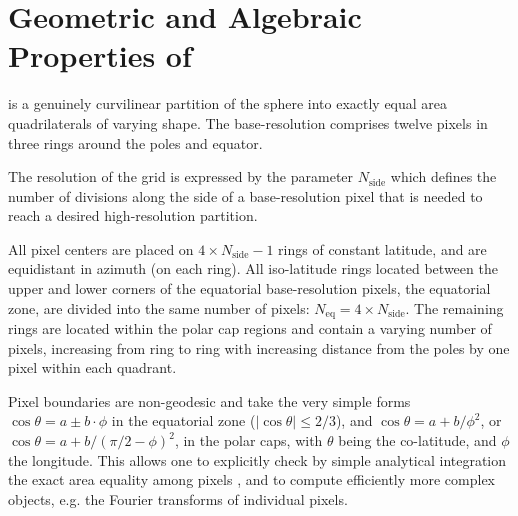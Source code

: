 \documentclass[12pt,twoside]{article}
\newcommand{\nside}{N_{\mathrm{side}}}
\begin{document}
\section{Geometric and Algebraic Properties of \healpix}

\healpix is a genuinely curvilinear partition of the sphere into exactly equal area
quadrilaterals of varying shape. The base-resolution comprises twelve pixels in three
rings around the poles and equator. 

The resolution of the grid is expressed by the parameter $\nside$ which defines the number
of divisions along the side of a base-resolution pixel that is needed to reach a desired
high-resolution partition.

All pixel centers are placed on $ 4\times \nside-1$ 
rings of constant latitude, 
and are equidistant in azimuth
(on each ring). All iso-latitude rings located between the upper and lower corners of
the equatorial base-resolution pixels, the equatorial zone, 
are divided into the same number of pixels: 
$N_{\mathrm{eq}}= 4\times \nside$. The remaining rings are located within the
polar cap regions and contain a varying number of pixels, increasing 
from ring to ring with increasing distance
from the poles by one pixel within each quadrant. 

Pixel boundaries are non-geodesic and take the very simple 
forms $\cos \theta = a \pm b \cdot \phi  $ in the equatorial zone 
($|\cos \theta| \le 2/3$), 
and $\cos \theta = a + b / \phi^2  $, or
  $\cos \theta = a + b / (\pi/2 - \phi) ^2  $,
in the polar caps, with $\theta$ being the co-latitude, and $\phi$ the longitude.
This allows one to explicitly check by simple analytical integration the 
exact area equality among pixels \citep{gorskihealpix05},
and to compute efficiently more complex objects, 
e.g. the Fourier transforms of individual pixels.
\end{document}
